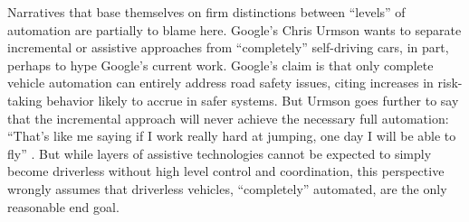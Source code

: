 

Narratives that base themselves on firm distinctions between
``levels'' of automation are partially to blame here. Google's Chris
Urmson wants to separate incremental or assistive 
approaches from ``completely'' self-driving cars, in part, perhaps to
hype Google's current work. Google's claim is that only complete
vehicle automation can entirely address road safety issues, citing
increases in risk-taking behavior likely to accrue in safer systems.
But Urmson goes further to say that the incremental approach will
never achieve the necessary full automation: ``That’s like me saying
if I work really hard at jumping, one day I will be able to fly''
\cite{???-http://recode.net/2015/03/17/google-self-driving-car-chief-wants-tech-on-the-market-within-five-years/}.
But while layers of assistive technologies cannot be expected to simply become
driverless without high level control and coordination, this perspective wrongly
assumes that driverless vehicles, ``completely'' automated, are the
only reasonable end goal. 



